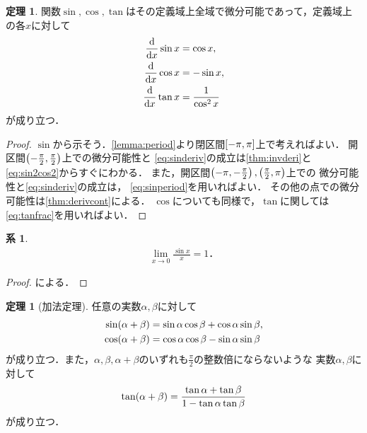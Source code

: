 \documentclass[11pt,a4paper]{ltjsarticle}
\theoremstyle{definition}
\newtheorem{thm}[dfn]{定理}
\newtheorem{coro}[dfn]{系}
\begin{document}
\begin{thm} \label{thm:trigoderiv}
  関数$\sin, \cos, \tan$はその定義域上全域で微分可能であって，定義域上の各$x$に対して
  \begin{align}
    \diff*{\sin x}x & = \cos x,
    \label{eq:sinderiv} \\
    \diff*{\cos x}x & = - \sin x,
    \label{eq:cosderiv} \\
    \diff*{\tan x}x & = \frac{1}{\cos^2 x}
    \label{eq:tanderiv}
  \end{align}
  が成り立つ．
\end{thm}

\begin{proof}
  $\sin$から示そう．\cref{lemma:period}より閉区間$\interval{c}{-\pi, \pi}$上で考えればよい．
  開区間$\interval{op}{-\frac{\pi}{2},\frac{\pi}{2}}$上での微分可能性と
  \cref{eq:sinderiv}の成立は\cref{thm:invderi}と\cref{eq:sin2cos2}からすぐにわかる．
  また，開区間$\interval{op}{-\pi, -\frac{\pi}{2}}, \interval{op}{\frac{\pi}{2}, \pi}$上での
  微分可能性と\cref{eq:sinderiv}の成立は，
  \cref{eq:sinperiod}を用いればよい．
  その他の点での微分可能性は\cref{thm:derivcont}による．
  $\cos$についても同様で，$\tan$に関しては\cref{eq:tanfrac}を用いればよい．
\end{proof}

\begin{coro} \label{coro:sinlim}
  \begin{align}
    \lim_{x \to 0} \frac{\sin x}{x} = 1 \text{．}
    \label{eq:sinlim}
  \end{align}
\end{coro}

\begin{proof}
  による．
\end{proof}

\begin{thm}[加法定理] \label{thm:trigosum}
  任意の実数$\alpha, \beta$に対して
  \begin{align}
    \apply{\sin}{\alpha + \beta} & = \sin \alpha \cos \beta + \cos \alpha \sin \beta,
    \label{eq:sinsum} \\
    \apply{\cos}{\alpha + \beta} & = \cos \alpha \cos \beta - \sin \alpha \sin \beta
    \label{eq:cossum}
  \end{align}
  が成り立つ．また，$\alpha, \beta , \alpha + \beta$のいずれも$\frac{\pi}{2}$の整数倍にならないような
  実数$\alpha, \beta$に対して
  \begin{align}
    \apply{\tan}{\alpha + \beta} = \frac{\tan \alpha + \tan \beta}{1 - \tan \alpha \tan \beta}
    \label{eq:tansum}
  \end{align}
  が成り立つ．
\end{thm}
\end{document}
